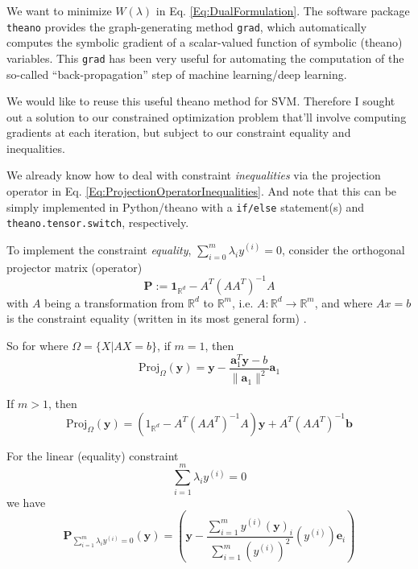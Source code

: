 \documentclass[10pt]{amsart}
\begin{document}
\begin{multicols*}{2}
We want to minimize $W(\lambda)$ in Eq. \ref{Eq:DualFormulation}.  The software package \verb|theano| provides the graph-generating method \verb|grad|, which automatically computes the symbolic gradient of a scalar-valued function of symbolic (theano) variables.  This \verb|grad| has been very useful for automating the computation of the so-called ``back-propagation'' step of machine learning/deep learning.

We would like to reuse this useful theano method for SVM.  Therefore I sought out a solution to our constrained optimization problem that'll involve computing gradients at each iteration, but subject to our constraint equality and inequalities.

We already know how to deal with constraint \emph{inequalities} via the projection operator in Eq. \ref{Eq:ProjectionOperatorInequalities}.  And note that this can be simply implemented in Python/theano with a \verb|if/else| statement(s) and \verb|theano.tensor.switch|, respectively.  

To implement the constraint \emph{equality}, $\sum_{i=0}^m \lambda_i y^{(i)} = 0$, consider the orthogonal projector matrix (operator)
\begin{equation}
  \mathbf{P} := \mathbf{1}_{\mathbb{R}^d} - A^T(AA^T)^{-1}A 
  \end{equation}
with $A$ being a transformation from $\mathbb{R}^d$ to $\mathbb{R}^m$, i.e. $A: \mathbb{R}^d \to \mathbb{R}^m$, and where $Ax = b$ is the constraint equality (written in its most general form) \cite{ChZa2013}.  

So for where $\Omega = \lbrace X | AX = b \rbrace$, if $m=1$, then
\[
\text{Proj}_{\Omega}(\mathbf{y}) = \mathbf{y} - \frac{\mathbf{a}_1^T \mathbf{y} - b}{ \| \mathbf{a}_1 \|^2 } \mathbf{a}_1
\]

If $m>1$, then
\[
\text{Proj}_{\Omega}(\mathbf{y}) = (1_{\mathbb{R}^d} - A^T(AA^T)^{-1}A)\mathbf{y}+A^T(AA^T)^{-1}\mathbf{b}
\]

For the linear (equality) constraint
\[
\sum_{i=1}^m \lambda_iy^{(i)} = 0 
\]
we have
\begin{equation}
  \mathbf{P}_{\sum_{i=1}^m\lambda_iy^{(i)} = 0 }(\mathbf{y}) = \left( \mathbf{y} - \frac{ \sum_{i=1}^m y^{(i)} (\mathbf{y})_i }{ \sum_{i=1}^m (y^{(i)})^2 } (y^{(i)})\mathbf{e}_i \right)
  \end{equation}



\end{multicols*}
\end{document}
